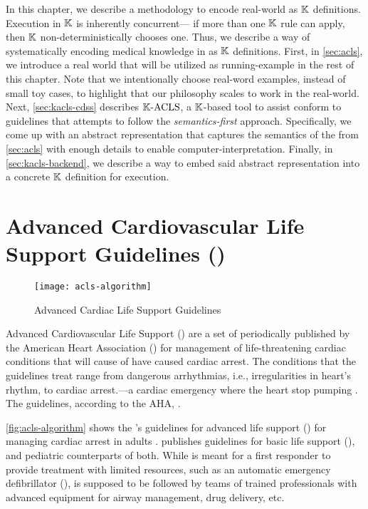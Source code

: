 In this chapter, we describe a methodology to encode real-world \BPGs{}
as $\mathbb{K}$ definitions. Execution in $\mathbb{K}{}$ is inherently concurrent---
if more than one $\mathbb{K}{}$ rule can apply, then $\mathbb{K}$ non-deterministically
chooses one. Thus, we describe a way of systematically encoding
medical knowledge in \BPGs{} as $\mathbb{K}$ definitions. First, in
\autoref{sec:acls}, we introduce a real world \BPG{} that will be
utilized as running-example in the rest of this chapter. Note that
we intentionally choose real-word examples, instead of small toy cases,
to highlight that our philosophy scales to work in the real-world.
Next, \autoref{sec:kacls-cdss} describes $\mathbb{K}{}\text{-ACLS}{}$, a $\mathbb{K}$-based tool
to assist \HCPs{} conform to \ACLS{} guidelines that attempts to
follow the \emph{semantics-first} approach. Specifically,
we come up with an abstract representation that captures the semantics
of the \BPG{} from \autoref{sec:acls} with enough details to
enable computer-interpretation. Finally, in \autoref{sec:kacls-backend},
we describe a way to embed said abstract representation into a concrete
$\mathbb{K}$ definition for execution.

\section{Advanced Cardiovascular Life Support Guidelines (\ACLS{})}\label{sec:acls}

\begin{figure}[t!]
  \centering
  \texttt{[image: acls-algorithm]}
  \caption{Advanced Cardiac Life Support Guidelines}\label{fig:acls-algorithm}
\end{figure}

Advanced Cardiovascular Life Support (\ACLS{}) are a set of \BPGs{} periodically
published by the American Heart Association (\AHA{}) for management of
life-threatening cardiac conditions that will cause of have caused cardiac
arrest. The conditions that the guidelines treat range from dangerous arrhythmias, i.e.,
irregularities in heart's rhythm, to cardiac arrest.---a cardiac emergency where
the heart stop pumping \cite{ACLSWikiEntry}.
The guidelines, according to the AHA{},  \cite{ACLSUrl}.

\autoref{fig:acls-algorithm} shows the \AHA{}'s guidelines for advanced
life support (\ACLS{}) for managing cardiac arrest in adults \cite{ACLSGuidelineUrl}.
\AHA{} publishes guidelines
for basic life support (\BLS{}), and pediatric counterparts of both. While
\BLS{} is meant for a first responder to provide treatment with
limited resources, such as an automatic emergency defibrillator (\AED{}),
\ACLS{} is supposed to be followed by teams of
trained professionals with advanced equipment for airway management,
drug delivery, etc.

